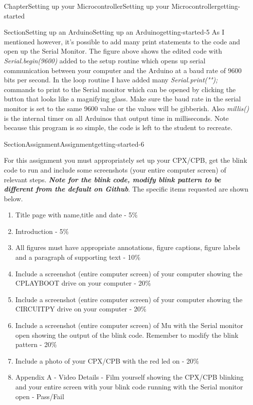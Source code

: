 \documentclass[oneside,10pt,]{book}
\newcommand{\alert}[1]{\textbf{\textit{#1}}}
\numberwithin{equation}{section}
\begin{document}
\begin{chapterptx}{Chapter}{Setting up your Microcontroller}{}{Setting up your Microcontroller}{}{}{getting-started}
\begin{sectionptx}{Section}{Setting up an Arduino}{}{Setting up an Arduino}{}{}{getting-started-5}
As I mentioned however, it's possible to add many print statements to the code and open up the Serial Monitor. The figure above shows the edited code with \emph{Serial.begin(9600)} added to the setup routine which opens up serial communication between your computer and the Arduino at a baud rate of 9600 bits per second. In the loop routine I have added many \emph{Serial.print("");} commands to print to the Serial monitor which can be opened by clicking the button that looks like a magnifying glass. Make sure the baud rate in the serial monitor is set to the same 9600 value or the values will be gibberish. Also \emph{millis()} is the internal timer on all Arduinos that output time in milliseconds. Note because this program is so simple, the code is left to the student to recreate.%
\end{sectionptx}
%
%
\typeout{************************************************}
\typeout{************************************************}
%
\begin{sectionptx}{Section}{Assignment}{}{Assignment}{}{}{getting-started-6}
\begin{introduction}{}%
For this assignment you must appropriately set up your CPX\slash{}CPB, get the blink code to run and include some screenshots (your entire computer screen) of relevant steps. \alert{Note for the blink code, modify blink pattern to be different from the default on Github}. The specific items requested are shown below.%
%
\begin{enumerate}
\item{}Title page with name,title and date - 5\%%
\item{}Introduction - 5\%%
\item{}All figures must have appropriate annotations, figure captions, figure labels and a paragraph of supporting text - 10\%%
\item{}Include a screenshot (entire computer screen) of your computer showing the CPLAYBOOT drive on your computer - 20\%%
\item{}Include a screenshot (entire computer screen) of your computer showing the CIRCUITPY drive on your computer - 20\%%
\item{}Include a screenshot (entire computer screen) of Mu with the Serial monitor open showing the output of the blink code. Remember to modify the blink pattern - 20\%%
\item{}Include a photo of your CPX\slash{}CPB with the red led on - 20\%%
\item{}Appendix A - Video Details - Film yourself showing the CPX\slash{}CPB blinking and your entire screen with your blink code running with the Serial monitor open - Pass\slash{}Fail%

\end{enumerate}
\end{introduction}
\end{sectionptx}
\end{chapterptx}
\end{document}
